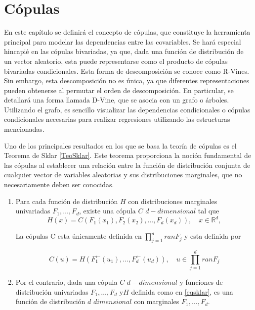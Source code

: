 
\chapter{Cópulas}

En este capítulo se definirá el concepto de cópulas, que constituye la herramienta principal para modelar las dependencias entre las covariables. Se hará especial hincapié en las cópulas bivariadas, ya que, dada una función de distribución de un vector aleatorio, esta puede representarse como el producto de cópulas bivariadas condicionales. Esta forma de descomposición se conoce como R-Vines. Sin embargo, esta descomposición no es única, ya que diferentes representaciones pueden obtenerse al permutar el orden de descomposición. En particular, se detallará una forma llamada D-Vine, que se asocia con un grafo o árboles. Utilizando el grafo, es sencillo visualizar las dependencias condicionales o cópulas condicionales necesarias para realizar regresiones utilizando las estructuras mencionadas.

Uno de los principales resultados en los que se basa la teoría de cópulas es el Teorema de Sklar \ref{TeoSklar}. Este teorema proporciona la noción fundamental de las cópulas al establecer una relación entre la función de distribución conjunta de cualquier vector de variables aleatorias y sus distribuciones marginales, que no necesariamente deben ser conocidas. 


\begin{teor}\label{TeoSklar}
    \begin{enumerate}
    \item Para cada función de distribución $H$ con distribuciones marginales univariadas $F_1, \dots, F_d$, existe una cópula $C$ $d-dimensional$ tal que 
    \begin{equation}\label{eqsklar}
        H(x) = C(F_1(x_1), F_2(x_2), \dots, F_d(x_d)), \quad x \in \mathbb{R}^{d},
    \end{equation}

    La cópulas C esta únicamente definida en $\prod_{j = 1}^{d}ran F_j$ y esta definida por

    \begin{equation}
        C(u) = H(F_1^{\leftarrow}(u_1), \dots, F_d^{\leftarrow}(u_d)), \quad u \in \prod_{j = 1}^{d}ran F_j
    \end{equation}
    
    \item Por el contrario, dada una cópula $C$ $d-dimensional$ y funciones de distribución univariadas $F_1, \dots, F_d$ y$H$ definida como en \eqref{eqsklar}, es una función de distribución $d$ $dimensional$ con marginales $F_1, \dots, F_d$. \cite{CopulasR}
    \end{enumerate}
\end{teor}

